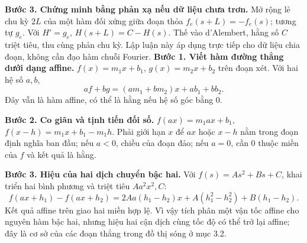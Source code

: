 \textbf{Bước 3. Chứng minh bằng phản xạ nếu dữ liệu chưa trơn.} Mở rộng lẻ chu kỳ $2L$ của một hàm đối xứng giữa đoạn thỏa $f_e(s+L)=-f_e(s)$; tương tự $g_e$. Với $H'=g_e$, $H(s+L)=C-H(s)$. Thế vào d'Alembert, hằng số $C$ triệt tiêu, thu cùng phản chu kỳ. Lập luận này áp dụng trực tiếp cho dữ liệu chia đoạn, không cần đạo hàm chuỗi Fourier.
\textbf{Bước 1. Viết hàm đường thẳng dưới dạng affine.} $f(x)=m_1x+b_1$, $g(x)=m_2x+b_2$ trên đoạn xét. Với hai hệ số $a,b$,
\[af+bg=(am_1+bm_2)x+ab_1+bb_2.\]
Đây vẫn là hàm affine, có thể là hằng nếu hệ số góc bằng $0$.

\textbf{Bước 2. Co giãn và tịnh tiến đối số.} $f(ax)=m_1ax+b_1$, $f(x-h)=m_1x+b_1-m_1h$. Phải giới hạn $x$ để $ax$ hoặc $x-h$ nằm trong đoạn định nghĩa ban đầu; nếu $a<0$, chiều của đoạn đảo; nếu $a=0$, cần $0$ thuộc miền của $f$ và kết quả là hằng.

\textbf{Bước 3. Hiệu của hai dịch chuyển bậc hai.} Với $f(s)=As^2+Bs+C$, khai triển hai bình phương và triệt tiêu $Aa^2x^2,C$:
\[f(ax+h_1)-f(ax+h_2)=2Aa(h_1-h_2)x+A(h_1^2-h_2^2)+B(h_1-h_2).\]
Kết quả affine trên giao hai miền hợp lệ. Vì vậy tích phân một vận tốc affine cho nguyên hàm bậc hai, nhưng hiệu hai cận dịch cùng tốc độ có thể trở lại affine; đây là cơ sở của các đoạn thẳng trong đồ thị sóng ở mục 3.2.
